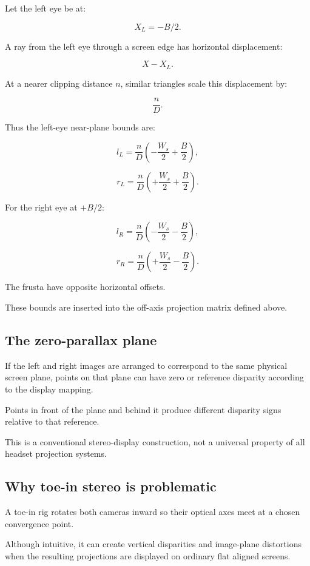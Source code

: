 Let the left eye be at:

\[ X_L=-B/2. \]

A ray from the left eye through a screen edge has horizontal displacement:

\[ X-X_L. \]

At a nearer clipping distance \(n\), similar triangles scale this displacement by:

\[ \frac nD. \]

Thus the left-eye near-plane bounds are:

\[ \boxed{ l_L=\frac nD\left(-\frac{W_s}{2}+\frac B2\right), } \]

\[ \boxed{ r_L=\frac nD\left(+\frac{W_s}{2}+\frac B2\right). } \]

For the right eye at \(+B/2\):

\[ \boxed{ l_R=\frac nD\left(-\frac{W_s}{2}-\frac B2\right), } \]

\[ \boxed{ r_R=\frac nD\left(+\frac{W_s}{2}-\frac B2\right). } \]

The frusta have opposite horizontal offsets.

These bounds are inserted into the off-axis projection matrix defined above.

\subsection{The zero-parallax plane}\label{02-foundations-ii-ch035-the-zero-parallax-plane}

If the left and right images are arranged to correspond to the same physical screen plane, points on that plane can have zero or reference disparity according to the display mapping.

Points in front of the plane and behind it produce different disparity signs relative to that reference.

This is a conventional stereo-display construction, not a universal property of all headset projection systems.

\subsection{Why toe-in stereo is problematic}\label{02-foundations-ii-ch035-why-toe-in-stereo-is-problematic}

A toe-in rig rotates both cameras inward so their optical axes meet at a chosen convergence point.

Although intuitive, it can create vertical disparities and image-plane distortions when the resulting projections are displayed on ordinary flat aligned screens.


